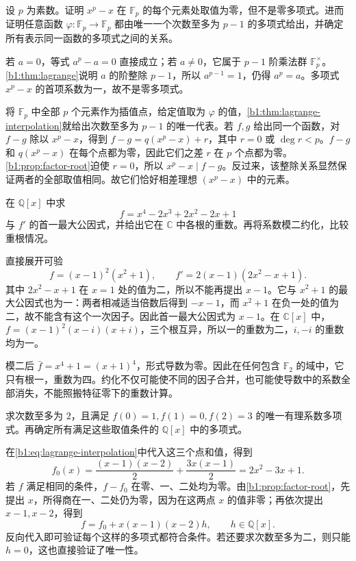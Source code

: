 \begin{exercise}\label{b1:ex:12-polynomial-functions}
	设 \(p\) 为素数。证明 \(x^p-x\) 在 \(\mathbb F_p\) 的每个元素处取值为零，但不是零多项式。进而证明任意函数 \(\varphi:\mathbb F_p\rightarrow\mathbb F_p\) 都由唯一一个次数至多为 \(p-1\) 的多项式给出，并确定所有表示同一函数的多项式之间的关系。
\end{exercise}
\begin{solution}
	若 \(a=0\)，等式 \(a^p-a=0\) 直接成立；若 \(a\ne0\)，它属于 \(p-1\) 阶乘法群 \(\mathbb F_p^\times\)。\cref{b1:thm:lagrange}说明 \(a\) 的阶整除 \(p-1\)，所以 \(a^{p-1}=1\)，仍得 \(a^p=a\)。多项式 \(x^p-x\) 的首项系数为一，故不是零多项式。

	将 \(\mathbb F_p\) 中全部 \(p\) 个元素作为插值点，给定值取为 \(\varphi\) 的值，\cref{b1:thm:lagrange-interpolation}就给出次数至多为 \(p-1\) 的唯一代表。若 \(f,g\) 给出同一个函数，对 \(f-g\) 除以 \(x^p-x\)，得到 \(f-g=q(x^p-x)+r\)，其中 \(r=0\) 或 \(\deg r<p\)。\(f-g\) 和 \(q(x^p-x)\) 在每个点都为零，因此它们之差 \(r\) 在 \(p\) 个点都为零。\cref{b1:prop:factor-root}迫使 \(r=0\)，所以 \(x^p-x\mid f-g\)。反过来，该整除关系显然保证两者的全部取值相同。故它们恰好相差理想 \((x^p-x)\) 中的元素。
\end{solution}

\begin{exercise}\label{b1:ex:12-repeated-roots}
	在 \(\mathbb Q[x]\) 中求
	\[
		f=x^4-2x^3+2x^2-2x+1
	\]
	与 \(f'\) 的首一最大公因式，并给出它在 \(\mathbb C\) 中各根的重数。再将系数模二约化，比较重根情况。
\end{exercise}
\begin{solution}
	直接展开可验
	\[
		f=(x-1)^2(x^2+1),\qquad f'=2(x-1)(2x^2-x+1).
	\]
	其中 \(2x^2-x+1\) 在 \(x=1\) 处的值为二，所以不能再提出 \(x-1\)。它与 \(x^2+1\) 的最大公因式也为一：两者相减适当倍数后得到 \(-x-1\)，而 \(x^2+1\) 在负一处的值为二，故不能含有这个一次因子。因此首一最大公因式为 \(x-1\)。在 \(\mathbb C[x]\) 中，\(f=(x-1)^2(x-i)(x+i)\)，三个根互异，所以一的重数为二，\(i,-i\) 的重数均为一。

	模二后 \(\bar f=x^4+1=(x+1)^4\)，形式导数为零。因此在任何包含 \(\mathbb F_2\) 的域中，它只有根一，重数为四。约化不仅可能使不同的因子合并，也可能使导数中的系数全部消失，不能照搬特征零下的重数计算。
\end{solution}

\begin{exercise}\label{b1:ex:12-interpolation}
	求次数至多为 \(2\)，且满足 \(f(0)=1,f(1)=0,f(2)=3\) 的唯一有理系数多项式。再确定所有满足这些取值条件的 \(\mathbb Q[x]\) 中的多项式。
\end{exercise}
\begin{solution}
	在\eqref{b1:eq:lagrange-interpolation}中代入这三个点和值，得到
	\[
		f_0(x)=\frac{(x-1)(x-2)}2+\frac{3x(x-1)}2 =2x^2-3x+1.
	\]
	若 \(f\) 满足相同的条件，\(f-f_0\) 在零、一、二处均为零。由\cref{b1:prop:factor-root}，先提出 \(x\)，所得商在一、二处仍为零，因为在这两点 \(x\) 的值非零；再依次提出 \(x-1,x-2\)，得到
	\[
		f=f_0+x(x-1)(x-2)h,\qquad h\in\mathbb Q[x].
	\]
	反向代入即可验证每个这样的多项式都符合条件。若还要求次数至多为二，则只能 \(h=0\)，这也直接验证了唯一性。
\end{solution}

